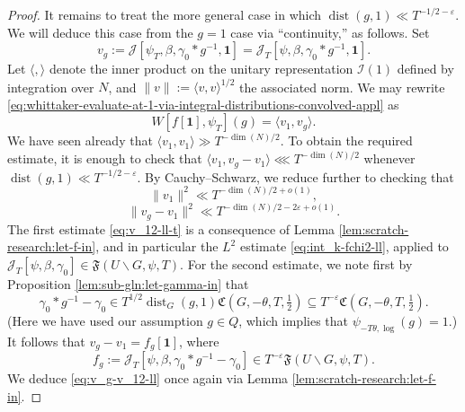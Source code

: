 \documentclass[reqno]{amsart}
\def\eps{\varepsilon}
\DeclareMathOperator{\dist}{dist}
\theoremstyle{plain} \newtheorem{theorem} {Theorem}
\theoremstyle{definition} \newtheorem{definition} [theorem] {Definition}
\theoremstyle{itplain} %
\numberwithin{equation}{section}
\numberwithin{theorem}{section}
\begin{document}
\begin{proof}
  It remains to treat the more general case in which $\dist(g,1) \ll T^{-1/2-\eps}$.  We will deduce this case from the $g = 1$ case via ``continuity,'' as follows.  Set
  \begin{equation*}
    v_g := \mathcal{J}[\psi_T,\beta,\gamma_0 \ast g^{-1}, \mathbf{1}] = \mathcal{J}_T[\psi,\beta,\gamma_0 \ast g^{-1}, \mathbf{1}].
  \end{equation*}
  Let $\langle ,  \rangle$ denote the inner product on the unitary representation $\mathcal{I}(1)$ defined by integration over $N$, and $\|v\| := \langle v, v \rangle^{1/2}$ the associated norm.  We may rewrite \eqref{eq:whittaker-evaluate-at-1-via-integral-distributions-convolved-appl} as
  \begin{equation*}
    W[f[\mathbf{1}], \psi_T](g) = \langle v_1, v_g \rangle.
  \end{equation*}
  We have seen already that $\langle v_1, v_1 \rangle \gg T^{-\dim(N)/2}$.  To obtain the required estimate, it is enough to check that $\langle v_1, v_g - v_1 \rangle \lll T^{-\dim(N)/2}$ whenever $\dist(g,1) \ll T^{-1/2-\eps}$.  By Cauchy--Schwarz, we reduce further to checking that
  \begin{equation}\label{eq:v_12-ll-t}
    \|v_1\|^2 \ll T^{-\dim(N)/2 + o(1)},
  \end{equation}
  \begin{equation}\label{eq:v_g-v_12-ll}
    \|v_g - v_1\|^2 \ll T^{-\dim(N)/2 - 2 \eps + o(1)}.
  \end{equation}
  The first estimate \eqref{eq:v_12-ll-t} is a consequence of Lemma \ref{lem:scratch-research:let-f-in}, and in particular the $L^2$ estimate \eqref{eq:int_k-fchi2-ll}, applied to $\mathcal{J}_T[\psi,\beta,\gamma_0] \in \mathfrak{F}(U \backslash G, \psi, T)$.  For the second estimate, we note first by Proposition \ref{lem:sub-gln:let-gamma-in} that
  \begin{equation*}
    \gamma_0 \ast g^{-1} - \gamma_0 \in T^{1/2} \dist_G(g,1) \mathfrak{C}(G,-\theta,T,\tfrac{1}{2})
    \subseteq
    T^{-\eps} \mathfrak{C}(G,-\theta,T,\tfrac{1}{2}).
  \end{equation*}
  (Here we have used our assumption $g \in Q$, which implies that $\psi_{- T \theta, \log}(g) = 1$.)  It follows that $v_g - v_1 = f_g[\mathbf{1}]$, where
  \begin{equation*}
    f_g := \mathcal{J}_T[\psi, \beta, \gamma_0 \ast g^{-1} - \gamma_0] \in T^{-\eps} \mathfrak{F}(U \backslash G, \psi, T).
  \end{equation*}
  We deduce \eqref{eq:v_g-v_12-ll} once again via Lemma \ref{lem:scratch-research:let-f-in}.
\end{proof}
\end{document}

